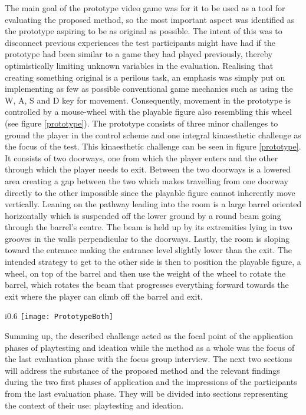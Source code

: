 The main goal of the prototype video game was for it to be used as a tool for evaluating the proposed method, so the most important aspect was identified as the prototype aspiring to be as original as possible. The intent of this was to disconnect previous experiences the test participants might have had if the prototype had been similar to a game they had played previously, thereby optimistically limiting unknown variables in the evaluation. Realising that creating something original is a perilous task, an emphasis was simply put on implementing as few as possible conventional game mechanics such as using the W, A, S and D key for movement. Consequently, movement in the prototype is controlled by a mouse-wheel with the playable figure also resembling this wheel (see figure \ref{prototype}). The prototype consists of three minor challenges to ground the player in the control scheme and one integral kinaesthetic challenge as the focus of the test. This kinaesthetic challenge can be seen in figure \ref{prototype}. It consists of two doorways, one from which the player enters and the other through which the player needs to exit. Between the two doorways is a lowered area creating a gap between the two which makes travelling from one doorway directly to the other impossible since the playable figure cannot inherently move vertically. Leaning on the pathway leading into the room is a large barrel oriented horizontally which is suspended off the lower ground by a round beam going through the barrel's centre. The beam is held up by its extremities lying in two grooves in the walls perpendicular to the doorways. Lastly, the room is sloping toward the entrance making the entrance level slightly lower than the exit. The intended strategy to get to the other side is then to position the playable figure, a wheel, on top of the barrel and then use the weight of the wheel to rotate the barrel, which rotates the beam that progresses everything forward towards the exit where the player can climb off the barrel and exit.

\begin{wrapfigure}{i}{0.6\textwidth}
  \texttt{[image: PrototypeBoth]}
  \caption{(a) In-game photo of the prototype as it is presented to a new player (b) The kinaesthetic challenge in focus}
  \label{prototype}
\end{wrapfigure}

Summing up, the described challenge acted as the focal point of the application phases of playtesting and ideation while the method as a whole was the focus of the last evaluation phase with the focus group interview. The next two sections will address the substance of the proposed method and the relevant findings during the two first phases of application and the impressions of the participants from the last evaluation phase. They will be divided into sections representing the context of their use: playtesting and ideation.

